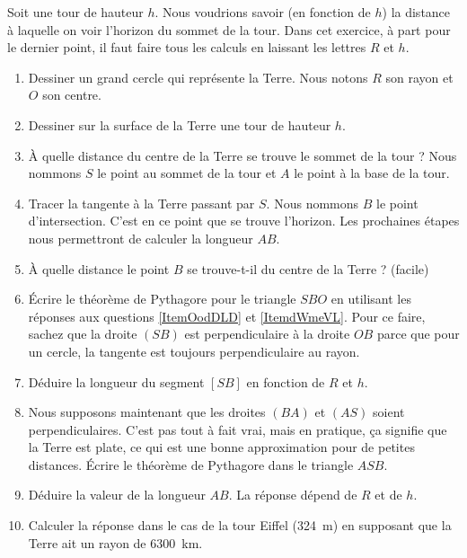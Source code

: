 
\begin{exercice}\label{exoSeconde-0080}


    Soit une tour de hauteur \( h\). Nous voudrions savoir (en fonction de \( h\)) la distance à laquelle on voir l'horizon du sommet de la tour. Dans cet exercice, à part pour le dernier point, il faut faire tous les calculs en laissant les lettres \( R\) et \( h\).
    \begin{enumerate}
        \item
            Dessiner un grand cercle qui représente la Terre. Nous notons \( R\) son rayon et \( O\) son centre.
        \item   \label{ItemOodDLD}
            Dessiner sur la surface de la Terre une tour de hauteur \( h\).
        \item
            À quelle distance du centre de la Terre se trouve le sommet de la tour ? Nous nommons \( S\) le point au sommet de la tour et \( A\) le point à la base de la tour.
        \item
            Tracer la tangente à la Terre passant par \( S\). Nous nommons \( B\) le point d'intersection. C'est en ce point que se trouve l'horizon. Les prochaines étapes nous permettront de calculer la longueur \( AB\).
        \item   \label{ItemdWmeVL}
            À quelle distance le point \( B\) se trouve-t-il du centre de la Terre ? (facile)
        \item
            Écrire le théorème de Pythagore pour le triangle \( SBO\) en utilisant les réponses aux questions \ref{ItemOodDLD} et \ref{ItemdWmeVL}. Pour ce faire, sachez que la droite \( (SB)\) est perpendiculaire à la droite \( OB\) parce que pour un cercle, la tangente est toujours perpendiculaire au rayon.
        \item
            Déduire la longueur du segment \( [SB]\) en fonction de \( R\) et \( h\).
        \item
            Nous supposons maintenant que les droites \( (BA)\) et \( (AS)\) soient perpendiculaires. C'est pas tout à fait vrai, mais en pratique, ça signifie que la Terre est plate, ce qui est une bonne approximation pour de petites distances. Écrire le théorème de Pythagore dans le triangle \( ASB\).
        \item
            Déduire la valeur de la longueur \( AB\). La réponse dépend de \( R\) et de \( h\).
        \item
            Calculer la réponse dans le cas de la tour Eiffel (\SI{324}{\meter}) en supposant que la Terre ait un rayon de \SI{6300}{\kilo\meter}.
    \end{enumerate}

\end{exercice}
